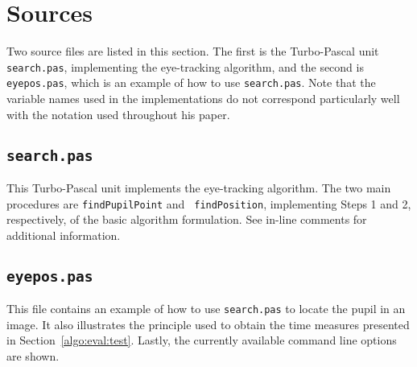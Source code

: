 
\section{Sources}
\label{implem:sources}

Two source files are listed in this section.  The first is the
Turbo-Pascal unit {\tt search.pas}, implementing the {\octopus}
eye-tracking algorithm, and the second is {\tt eyepos.pas}, which is
an example of how to use {\tt search.pas}.  Note that the variable
names used in the implementations do not correspond particularly well
with the notation used throughout his paper.

\subsection{\tt search.pas}
\label{implem:sources:search}

This Turbo-Pascal unit implements the {\octopus} eye-tracking
algorithm.  The two main procedures are {\tt findPupilPoint} and {\tt
  findPosition}, implementing Steps 1 and 2, respectively, of the
basic algorithm formulation.  See in-line comments for additional
information.
\vspace*{0.5cm}

\begin{tgrind}
  
\end{tgrind}

\newpage
\subsection{\tt eyepos.pas}
\label{implem:sources:eyepos}

This file contains an example of how to use {\tt search.pas} to locate
the pupil in an image.  It also illustrates the principle used to
obtain the time measures presented in Section~\ref{algo:eval:test}.
Lastly, the currently available command line options are shown.
\vspace*{0.5cm}

\begin{tgrind}
  
\end{tgrind}
